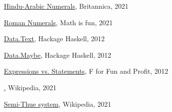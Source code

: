\documentclass{article}
\begin{document}
\begin{thebibliography}{99}
\href{https://www.britannica.com/topic/Hindu-Arabic-numerals}{Hindu-Arabic Numerals}, Britannica, 2021

\href{https://www.mathsisfun.com/roman-numerals.html}{Roman Numerals}, Math is fun, 2021

\href{https://hackage.haskell.org/package/text-1.2.4.0/docs/Data-Text.html}{Data.Text}, Hackage Haskell, 2012

\href{https://hackage.haskell.org/package/base-4.16.0.0/docs/Data-Maybe.html}{Data.Maybe}, Hackage Haskell, 2012

\href{https://fsharpforfunandprofit.com/posts/expressions-vs-statements/}{Expressions vs. Statements}, F for Fun and Profit, 2012

\href{https://en.wikipedia.org/wiki/Lazy_evaluation}, Wikipedia, 2021

\href{https://en.wikipedia.org/wiki/Semi-Thue_system}{Semi-Thue system}, Wikipedia, 2021
\end{thebibliography}
\end{document}
